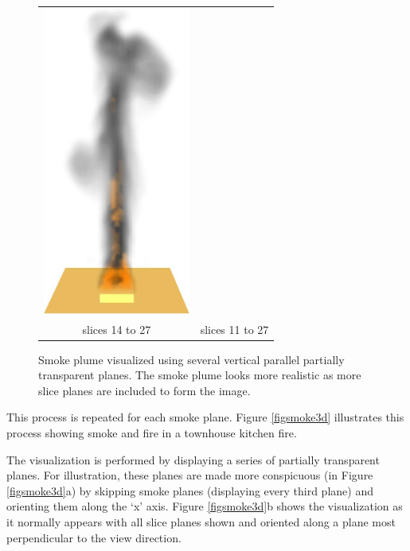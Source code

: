 \begin{figure}[\figoptions]
\begin{center}
\begin{tabular}{cc}
\includegraphics[height=4.0in]{figures/splume_11_27}\\
slices 14 to 27&slices 11 to 27
\end{tabular}
\end{center}
\caption [Smoke plume visualized using several vertical parallel
partially transparent planes.] {Smoke plume visualized using
several vertical parallel partially transparent planes. The smoke
plume looks more realistic as more slice planes
are included to form the image. } \label{figplume}
\end{figure}

\noindent This process is repeated for each smoke plane. Figure \ref{figsmoke3d} illustrates this process showing smoke and fire in a townhouse kitchen fire.

The visualization is performed by displaying a series of partially transparent planes. For illustration, these planes are made more conspicuous (in Figure \ref{figsmoke3d}a) by skipping smoke planes (displaying every third plane) and orienting them along the `x' axis. Figure \ref{figsmoke3d}b shows the visualization as it normally appears with all slice planes shown and oriented along a
plane most perpendicular to the view direction.

